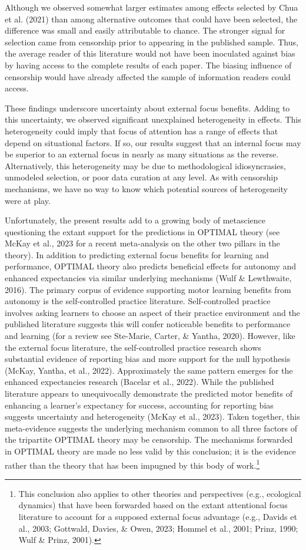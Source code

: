 \documentclass[
  man, donotrepeattitle,floatsintext]{apa7}
\begin{document}
Although we observed somewhat larger estimates among effects selected by Chua et al. (2021) than among alternative outcomes that could have been selected, the difference was small and easily attributable to chance. The stronger signal for selection came from censorship prior to appearing in the published sample. Thus, the average reader of this literature would not have been inoculated against bias by having access to the complete results of each paper. The biasing influence of censorship would have already affected the sample of information readers could access.

These findings underscore uncertainty about external focus benefits. Adding to this uncertainty, we observed significant unexplained heterogeneity in effects. This heterogeneity could imply that focus of attention has a range of effects that depend on situational factors. If so, our results suggest that an internal focus may be superior to an external focus in nearly as many situations as the reverse. Alternatively, this heterogeneity may be due to methodological idiosyncrasies, unmodeled selection, or poor data curation at any level. As with censorship mechanisms, we have no way to know which potential sources of heterogeneity were at play.

Unfortunately, the present results add to a growing body of metascience questioning the extant support for the predictions in OPTIMAL theory (see McKay et al., 2023 for a recent meta-analysis on the other two pillars in the theory). In addition to predicting external focus benefits for learning and performance, OPTIMAL theory also predicts beneficial effects for autonomy and enhanced expectancies via similar underlying mechanisms (Wulf \& Lewthwaite, 2016). The primary corpus of evidence supporting motor learning benefits from autonomy is the self-controlled practice literature. Self-controlled practice involves asking learners to choose an aspect of their practice environment and the published literature suggests this will confer noticeable benefits to performance and learning (for a review see Ste-Marie, Carter, \& Yantha, 2020). However, like the external focus literature, the self-controlled practice research shows substantial evidence of reporting bias and more support for the null hypothesis (McKay, Yantha, et al., 2022). Approximately the same pattern emerges for the enhanced expectancies research (Bacelar et al., 2022). While the published literature appears to unequivocally demonstrate the predicted motor benefits of enhancing a learner's expectancy for success, accounting for reporting bias suggests uncertainty and heterogeneity (McKay et al., 2023). Taken together, this meta-evidence suggests the underlying mechanism common to all three factors of the tripartite OPTIMAL theory may be censorship. The mechanisms forwarded in OPTIMAL theory are made no less valid by this conclusion; it is the evidence rather than the theory that has been impugned by this body of work.\footnote{This conclusion also applies to other theories and perspectives (e.g., ecological dynamics) that have been forwarded based on the extant attentional focus literature to account for a supposed external focus advantage (e.g., Davids et al., 2003; Gottwald, Davies, \& Owen, 2023; Hommel et al., 2001; Prinz, 1990; Wulf \& Prinz, 2001).}
\end{document}
